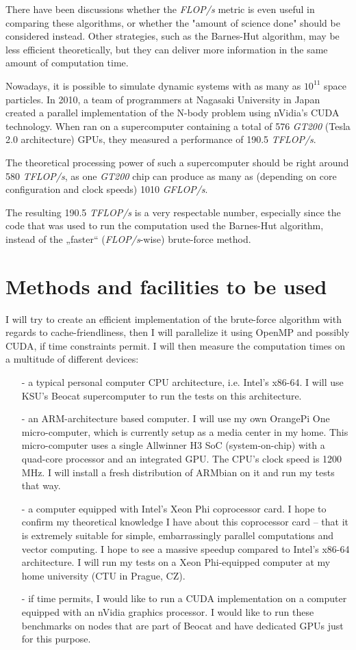 \documentclass[12pt]{article}
\begin{document}
There have been discussions whether the \textit{FLOP/s} metric is even useful in comparing these algorithms, or whether the "amount of science done" should be considered instead. Other strategies, such as the Barnes-Hut algorithm, may be less efficient theoretically, but they can deliver more information in the same amount of computation time.

Nowadays, it is possible to simulate dynamic systems with as many as $10^{11}$ space particles. In 2010, a team of programmers at Nagasaki University in Japan created a parallel implementation of the N-body problem using nVidia’s CUDA technology. When ran on a supercomputer containing a total of 576 \textit{GT200} (Tesla 2.0 architecture) GPUs, they measured a performance of 190.5 \textit{TFLOP/s}. \cite{teraflops}

The theoretical processing power of such a supercomputer should be right around 580 \textit{TFLOP/s}, as one \textit{GT200} chip can produce as many as (depending on core configuration and clock speeds) 1010 \textit{GFLOP/s}.\cite{wikitesla}

The resulting 190.5 \textit{TFLOP/s} is a very respectable number, especially since the code that was used to run the computation used the Barnes-Hut algorithm, instead of the „faster“ (\textit{FLOP/s}-wise) brute-force method.

\section{Methods and facilities to be used}
I will try to create an efficient implementation of the brute-force algorithm with regards to cache-friendliness, then I will parallelize it using OpenMP and possibly CUDA, if time constraints permit. 
I will then measure the computation times on a multitude of different devices:
\begin{itemize}  
\item[-]{a typical personal computer CPU architecture, i.e. Intel’s x86-64. I will use KSU’s Beocat supercomputer to run the tests on this architecture.}
\item[-]{an ARM-architecture based computer. I will use my own OrangePi One micro-computer, which is currently setup as a media center in my home. This micro-computer uses a single Allwinner H3 SoC (system-on-chip) with a quad-core processor and an integrated GPU. The CPU's clock speed is 1200 MHz. I will install a fresh distribution of ARMbian on it and run my tests that way.}
\item[-]{a computer equipped with Intel’s Xeon Phi coprocessor card. I hope to confirm my theoretical knowledge I have about this coprocessor card – that it is extremely suitable for simple, embarrassingly parallel computations and vector computing. I hope to see a massive speedup compared to Intel’s x86-64 architecture. I will run my tests on a Xeon Phi-equipped computer at my home university (CTU in Prague, CZ).}
\item[-]{if time permits, I would like to run a CUDA implementation on a computer equipped with an nVidia graphics processor. I would like to run these benchmarks on nodes that are part of Beocat and have dedicated GPUs just for this purpose.}
\end{itemize}
\end{document}
